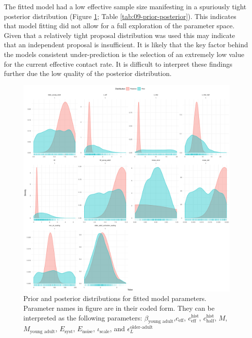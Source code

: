 \documentclass[11pt,twoside]{bristolthesis}
\begin{document}
  The fitted model had a low effective sample size manifesting in a spuriously tight posterior distribution (Figure \ref{fig:09-fig-prior-params}; Table \ref{tab:09-prior-posterior}). This indicates that model fitting did not allow for a full exploration of the parameter space. Given that a relatively tight proposal distribution was used this may indicate that an independent proposal is insufficient. It is likely that the key factor behind the models consistent under-prediction is the selection of an extremely low value for the current effective contact rate. It is difficult to interpret these findings further due the low quality of the posterior distribution.
  \begin{figure}
  
  {\centering \includegraphics[width=0.8\linewidth]{chapters/model-fitting/plots/prior-posterior-overview-1} 
  
  }
  
  \caption[Prior and posterior distributions for fitted model parameters.]{Prior and posterior distributions for fitted model parameters. Parameter names in figure are in their coded form. They can be interpreted as the following parameters:  $\beta_{\text{young adult}}$,$c_{\text{eff}}$, $c^{\text{hist}}_{\text{eff}}$, $c^{\text{hist}}_{\text{half}}$, $M$, $M_{\text{young adult}}$, $E_{\text{syst}}$, $E_{\text{noise}}$, $\iota_{\text{scale}}$, and $\epsilon^{\text{older-adult}}_L$}\label{fig:09-fig-prior-params}
  \end{figure}
\end{document}
